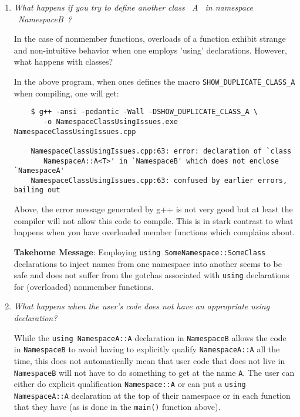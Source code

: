 \begin{enumerate}

{}\item\textit{What happens if you try to define another class ~A~ in
namespace ~NamespaceB~?}

In the case of nonmember functions, overloads of a function exhibit strange
and non-intuitive behavior when one employs 'using' declarations.  However,
what happens with classes?

In the above program, when ones defines the macro
{}\texttt{SHOW\-\_DUPLICATE\-\_CLASS\-\_A} when compiling, one will get:

{\small\begin{verbatim}
    $ g++ -ansi -pedantic -Wall -DSHOW_DUPLICATE_CLASS_A \
       -o NamespaceClassUsingIssues.exe NamespaceClassUsingIssues.cpp             

    NamespaceClassUsingIssues.cpp:63: error: declaration of `class 
       NamespaceA::A<T>' in `NamespaceB' which does not enclose `NamespaceA'
    NamespaceClassUsingIssues.cpp:63: confused by earlier errors, bailing out
\end{verbatim}}

Above, the error message generated by g++ is not very good but at least the
compiler will not allow this code to compile.  This is in stark contrast to
what happens when you have overloaded member functions which {}\cite[Item
59]{C++CodingStandards05} complains about.

{}\textbf{Takehome Message}: Employing {}\texttt{using
SomeNamespace::SomeClass} declarations to inject names from one namespace into
another seems to be safe and does not suffer from the gotchas associated with
{}\texttt{using} declarations for (overloaded) nonmember functions.

{}\item\textit{What happens when the user's code does not have an
appropriate using declaration?}

While the {}\texttt{using NamespaceA::A} declaration in {}\texttt{NamespaceB}
allows the code in {}\texttt{NamespaceB} to avoid having to explicitly qualify
{}\texttt{NamespaceA::A} all the time, this does not automatically mean that
user code that does not live in {}\texttt{NamespaceB} will not have to do
something to get at the name {}\texttt{A}.  The user can either do explicit
qualification {}\texttt{Namespace::A} or can put a {}\texttt{using
NamespaceA::A} declaration at the top of their namespace or in each function
that they have (as is done in the {}\texttt{main()} function above).


\end{enumerate}
